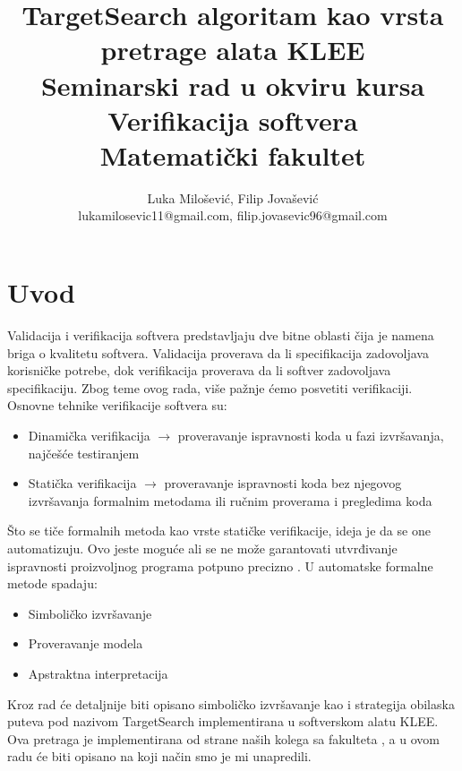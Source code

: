 \documentclass[a4paper]{article}
\begin{document}
\title{TargetSearch algoritam kao vrsta pretrage alata KLEE\\ \small{Seminarski rad u okviru kursa\\Verifikacija softvera\\ Matematički fakultet}}

\author{Luka Milošević, Filip Jovašević\\ lukamilosevic11@gmail.com, filip.jovasevic96@gmail.com}


\maketitle


\tableofcontents

\newpage

\section{Uvod}
\label{sec:uvod}
Validacija i verifikacija softvera predstavljaju dve bitne oblasti čija je namena briga o kvalitetu softvera. Validacija proverava da li specifikacija zadovoljava korisničke potrebe, dok verifikacija proverava da li softver zadovoljava specifikaciju. Zbog teme ovog rada, više pažnje ćemo posvetiti verifikaciji. \\
Osnovne tehnike verifikacije softvera su: 
\begin{itemize}
    \item Dinamička verifikacija $\rightarrow$ proveravanje ispravnosti koda u fazi izvršavanja, najčešće testiranjem
    \item Statička verifikacija $\rightarrow$ proveravanje ispravnosti koda bez njegovog izvršavanja formalnim metodama ili ručnim proverama i pregledima koda
\end{itemize}
Što se tiče formalnih metoda kao vrste statičke verifikacije, ideja je da se one automatizuju. Ovo jeste moguće ali se ne može garantovati utvrđivanje ispravnosti proizvoljnog programa potpuno precizno \cite{Verifikacija}. U automatske formalne metode spadaju:
\begin{itemize}
    \item Simboličko izvršavanje
    \item Proveravanje modela
    \item Apstraktna interpretacija
\end{itemize} 
Kroz rad će detaljnije biti opisano simboličko izvršavanje kao i strategija obilaska puteva pod nazivom TargetSearch implementirana u softverskom alatu KLEE. Ova pretraga je implementirana od strane naših kolega sa fakulteta \cite{git}, a u ovom radu će biti opisano na koji način smo je mi unapredili. 
\end{document}
